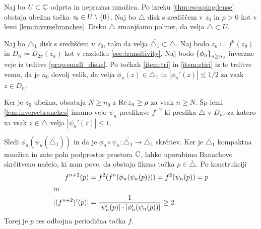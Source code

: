 \begin{dokaz}
    Naj bo \(U \subset \mathbb C\) odprta in neprazna množica. Po izreku \ref{thm:escapingdense} obstaja ubežna točka \(z_0 \in U \setminus \left\{ 0 \right\}\). Naj bo \(\triangle\) disk s središčem v \(z_0\) in \(\rho > 0\) kot v lemi \ref{lem:inversebranches}. Disku \(\triangle\) zmanjšamo polmer, da velja \(\triangle \subset U\).

    Naj bo \(\triangle_1\) disk s središčem v \(z_0\), tako da velja \(\overline{\triangle_1} \subset \triangle\). Naj bodo \(z_n \coloneq f^n (z_0)\) in \(D_n \coloneq D_{2 \pi} (z_n)\) kot v razdelku \ref{sec:transitivity}. Naj bodo \(\left\{ \phi_n \right\}_{n \geq n_0}\) inverzne veje iz trditve \ref{prop:small_disks}. Po točkah \ref{item:tri} in \ref{item:stiri} iz te trditve vemo, da je \(n_0\) dovolj velik, da velja \(\phi_n (z) \in \triangle_1\) in \(|\phi_n' (z)| \leq 1 / 2\) za vsak \(z \in D_n\).

    Ker je \(z_0\) ubežna, obsataja \(N \geq n_0\) z \(\operatorname{Re} z_n \geq \rho\) za vsak \(n \geq N\). Šp lemi \ref{lem:inversebranches} imamo vejo \(\psi_n\) preslikave \(f^{-2}\) ki preslika \(\triangle\) v \(D_n\), za katero za vsak \(z \in \triangle\) velja \(|\psi_n' (z)| \leq 1\).
    
    Sledi \(\phi_n (\psi_n (\overline{\triangle_1}))\) in da je \(\phi_n \circ \psi_{n} \colon \overline{\triangle_1} \to \overline{\triangle_1}\) skrčitev. Ker je \(\overline{\triangle_1}\) kompaktna množica in zato poln podprostor prostora \(\mathbb C\), lahko uporabimo Banachovo skrčitveno načelo, ki nam pove, da obstaja fiksna točka \(p \in \overline{\triangle}\). Po konstrukciji
    \begin{align*}
        f^{n + 2} (p) &= f^2 (f^n (\phi_n (\psi_n (p)))) = f^2 (\psi_n (p)) = p\\
        \intertext{in}
        |(f^{n + 2})' (p)| &= \frac{1}{|\psi_n' (p)| \cdot |\phi_n' (\psi_n (p))|} \geq 2.
    \end{align*}
    Torej je \(p\) res odbojna periodična točka \(f\).
\end{dokaz}